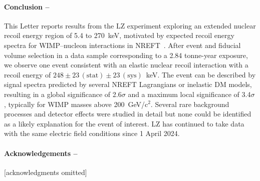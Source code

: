 \paragraph{Conclusion --\label{sec:conclusion}}

This Letter reports results from the LZ experiment exploring an extended nuclear recoil energy region of 5.4 to 270~keV, motivated by expected recoil energy spectra for WIMP--nucleon interactions in NREFT~\cite{Fitzpatrick:EFT}.
After event and fiducial volume selection in a data sample corresponding to a 2.84 tonne-year exposure, we observe one event consistent with an elastic nuclear recoil interaction with a recoil energy of $248\pm23\,\mathrm{(stat)}\pm23\,\mathrm{(sys)}$~keV. 
The event can be described by signal spectra predicted by several NREFT Lagrangians or inelastic DM models, resulting in a global significance of 2.6$\sigma$ and a maximum local significance of 3.4$\sigma$, typically for WIMP masses above 200~GeV/c$^2$.
Several rare background processes and detector effects were studied in detail but none could be identified as a likely explanation for the event of interest. LZ has continued to take data with the same electric field conditions since 1 April 2024.  

\paragraph{\label{sec:acknowledgements}Acknowledgements --}
[acknowledgments omitted]


